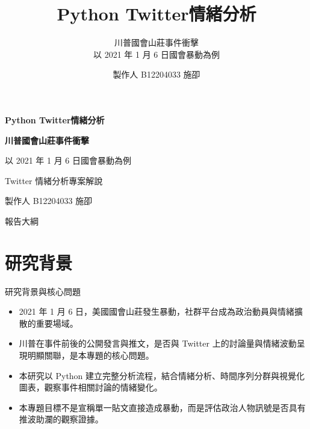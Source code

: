 \documentclass[aspectratio=169]{ctexbeamer}
\title{Python Twitter情緒分析}
\subtitle{川普國會山莊事件衝擊\\以 2021 年 1 月 6 日國會暴動為例}
\author{製作人 B12204033 施卲}
\institute{}
\date{}
\begin{document}
\begin{frame}[plain]

\vspace*{1.15cm}
\centering
{\color{TextLight}\bfseries\fontsize{26}{32}\selectfont Python Twitter情緒分析\par}
\vspace{0.24cm}
{\color{TextLight}\bfseries\fontsize{22}{28}\selectfont 川普國會山莊事件衝擊\par}
\vspace{0.45cm}
\par
\vspace{0.55cm}
{\color{TextLight!84}\Large 以 2021 年 1 月 6 日國會暴動為例\par}
\vspace{0.18cm}
{\color{TextLight!70}\large Twitter 情緒分析專案解說\par}
\vspace{1.0cm}
{\color{GradientEnd}\Large 製作人 B12204033 施卲\par}
\vfill
\end{frame}

\begin{frame}{報告大綱}
\tableofcontents
\end{frame}

\section{研究背景}

\begin{frame}{研究背景與核心問題}
\begin{itemize}
  \item 2021 年 1 月 6 日，美國國會山莊發生暴動，社群平台成為政治動員與情緒擴散的重要場域。
  \item 川普在事件前後的公開發言與推文，是否與 Twitter 上的討論量與情緒波動呈現明顯關聯，是本專題的核心問題。
  \item 本研究以 Python 建立完整分析流程，結合情緒分析、時間序列分群與視覺化圖表，觀察事件相關討論的情緒變化。
  \item 本專題目標不是宣稱單一貼文直接造成暴動，而是評估政治人物訊號是否具有推波助瀾的觀察證據。
\end{itemize}
\end{frame}
\end{document}
